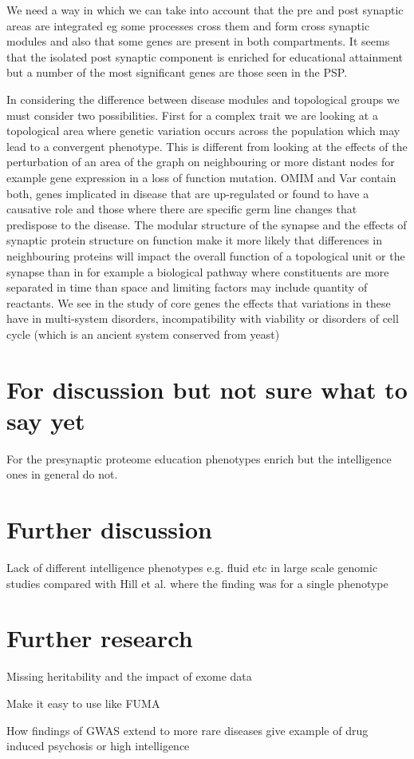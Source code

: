 We need a way in which we can take into account that the pre and post synaptic areas are integrated eg some processes cross them and form cross synaptic modules and also that some genes are present in both compartments. It seems that the isolated post synaptic component is enriched for educational attainment but a number of the most significant genes are those seen in the PSP.

In considering the difference between disease modules and topological groups we must consider two possibilities. First for a complex trait we are looking at a topological area where genetic variation occurs across the population which may lead to a convergent phenotype. This is different from looking at the effects of the perturbation of an area of the graph on neighbouring or more distant nodes for example gene expression in a loss of function mutation. OMIM and Var contain both, genes implicated in disease that are up-regulated or found to have a causative role and those where there are specific germ line changes that predispose to the disease. The modular structure of the synapse and the effects of synaptic protein structure on function make it more likely that differences in neighbouring proteins will impact the overall function of a topological unit or the synapse than in for example a biological pathway where constituents are more separated in time than space and limiting factors may include quantity of reactants. We see in the study of core genes the effects that variations in these have in multi-system disorders, incompatibility with viability or disorders of cell cycle (which is an ancient system conserved from yeast)

\section{For discussion but not sure what to say yet}

For the presynaptic proteome education phenotypes enrich but the intelligence ones in general do not. 

\section{Further discussion}
Lack of different intelligence phenotypes e.g. fluid etc in large scale genomic studies compared with Hill et al. where the finding was for a single phenotype
\section{Further research}
Missing heritability and the impact of exome data

Make it easy to use like FUMA

How findings of GWAS extend to more rare diseases give example of drug induced psychosis or high intelligence